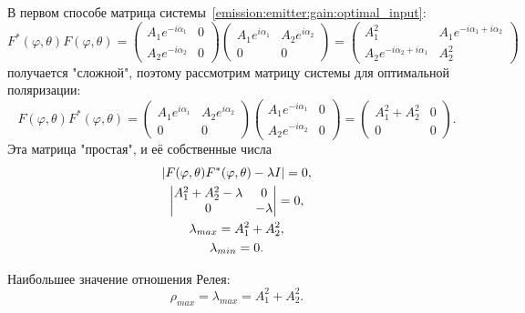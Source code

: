 В первом способе матрица системы~\eqref{emission:emitter:gain:optimal_input}:
\[
    F^*(\varphi, \theta) F(\varphi, \theta)
    =
    \begin{pmatrix}
        A_1 e^{-i \alpha_1} & 0 \\
        A_2 e^{-i \alpha_2} & 0
    \end{pmatrix}
    \begin{pmatrix}
        A_1 e^{i \alpha_1} & A_2 e^{i \alpha_2} \\
        0                  & 0
    \end{pmatrix}
    =
    \begin{pmatrix}
        A_1^2                            & A_1 e^{-i \alpha_1 + i \alpha_2} \\
        A_2 e^{-i \alpha_2 + i \alpha_1} & A_2^2
    \end{pmatrix}
\]
получается "сложной"{}, поэтому рассмотрим матрицу системы для оптимальной поляризации:
\[
    F(\varphi, \theta) F^*(\varphi, \theta)
    =
    \begin{pmatrix}
        A_1 e^{i \alpha_1} & A_2 e^{i \alpha_2} \\
        0                  & 0
    \end{pmatrix}
    \begin{pmatrix}
        A_1 e^{-i \alpha_1} & 0 \\
        A_2 e^{-i \alpha_2} & 0
    \end{pmatrix}
    =
    \begin{pmatrix}
        A_1^2 + A_2^2 & 0 \\
        0             & 0
    \end{pmatrix} .
\]
Эта матрица "простая"{}, и её собственные числа
\begin{gather*}
    \left | F(\varphi, \theta)F^*(\varphi, \theta) - \lambda I \right | = 0 , \\
    \begin{vmatrix}
        A_1^2 + A_2^2 - \lambda & 0         \\
        0                       & - \lambda
    \end{vmatrix} = 0, \\
    \lambda_{max} = A_1^2 + A_2^2 , \\
    \lambda_{min} = 0 .
\end{gather*}

Наибольшее значение отношения Релея:
\[
    \rho_{max} = \lambda_{max} = A_1^2 + A_2^2.
\]

